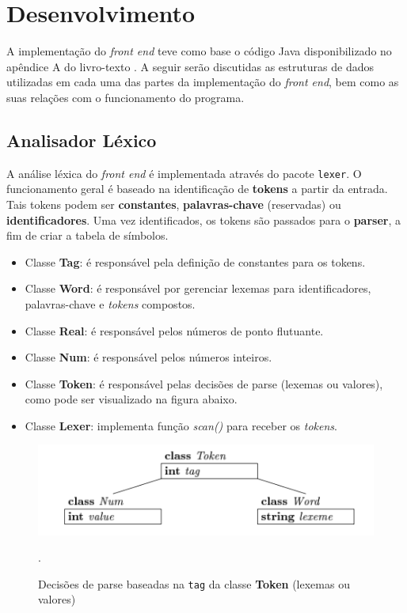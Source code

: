 \section{Desenvolvimento}

A implementação do \textit{front end} teve como base o código Java disponibilizado no apêndice A do livro-texto \cite{aho2007compilers}. A seguir serão discutidas as estruturas de dados utilizadas em cada uma das partes da implementação do \textit{front end}, bem como as suas relações com o funcionamento do programa.

\subsection{Analisador Léxico}
A análise léxica do \textit{front end} é implementada através do pacote \texttt{lexer}. O funcionamento geral é baseado na identificação de \textbf{tokens} a partir da entrada. Tais tokens podem ser \textbf{constantes}, \textbf{palavras-chave} (reservadas) ou \textbf{identificadores}. Uma vez identificados, os tokens são passados para o \textbf{parser}, a fim de criar a tabela de símbolos.

\begin{itemize}
\item Classe \textbf{Tag}: é responsável pela definição de constantes para os tokens.
\item Classe \textbf{Word}: é responsável por gerenciar lexemas para identificadores, palavras-chave e \textit{tokens} compostos.
\item Classe \textbf{Real}: é responsável pelos números de ponto flutuante.
\item Classe \textbf{Num}: é responsável pelos números inteiros.
\item Classe \textbf{Token}: é responsável pelas decisões de parse (lexemas ou valores), como pode ser visualizado na figura abaixo.
\item Classe \textbf{Lexer}: implementa função \textit{scan()} para receber os \textit{tokens}.
\end{itemize}

\begin{figure}[H]
	\includegraphics[width=1\textwidth]{imgs/lex_decisions.png}
	\caption{Decisões de parse baseadas na \texttt{tag} da classe \textbf{Token} (lexemas ou valores)}.
	\label{fig:dccnet}
\end{figure}

